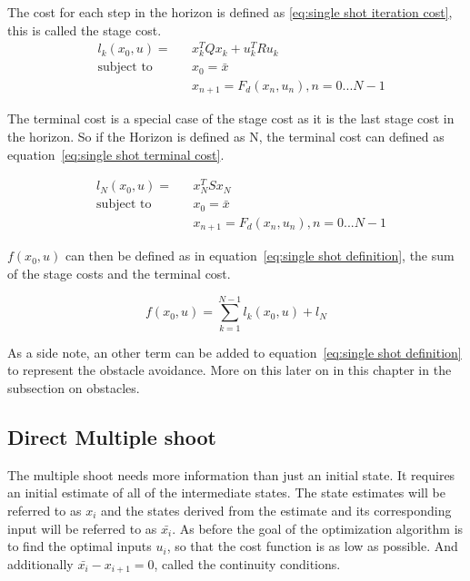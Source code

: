 			The cost for each step in the horizon is defined as \ref{eq:single shot iteration cost}, this is called the stage cost.
			\begin{equation}
				\begin{aligned}
				& l_k(x_0,u) = &&  x_k^T Q x_k  +  u_k^T R u_k \\
				& \text{subject to}			&& x_0 = \bar{x} \\
				& 							&&  x_{n+1} = F_d(x_n,u_n), n=0...N-1
				\end{aligned}
				\label{eq:single shot iteration cost}
			\end{equation}
			
			The terminal cost is a special case of the stage cost as it is the last stage cost in the horizon. So if the Horizon is defined as N, the terminal cost can defined as equation~\ref{eq:single shot terminal cost}.
			
			\begin{equation}
				\begin{aligned}
					& l_N(x_0,u) = && x_N^TSx_N \\
					& \text{subject to}			&& x_0 = \bar{x} \\
					& 							&&  x_{n+1} = F_d(x_n,u_n), n=0...N-1
				\end{aligned}
				\label{eq:single shot terminal cost}
			\end{equation}
			
			$f(x_0,u)$ can then be defined as in equation~\ref{eq:single shot definition}, the sum of the stage costs and the terminal cost.
			
			\begin{equation}
				f(x_0,u) = \sum_{k=1}^{N-1} l_k(x_0,u) + l_N
				\label{eq:single shot definition}
			\end{equation}
			
			As a side note, an other term can be added to equation~\ref{eq:single shot definition} to represent the obstacle avoidance. More on this later on in this chapter in the subsection on obstacles.
		\subsection{Direct Multiple shoot}
			The multiple shoot needs more information than just an initial state. It requires an initial estimate of all of the intermediate states. The state estimates will be referred to as $x_i$ and the states derived from the estimate and its corresponding input will be referred to as $\bar{x_i}$. As before the goal of the optimization algorithm is to find the optimal inputs $u_i$, so that the cost function is as low as possible. And additionally  $\bar{x_i} - x_{i+1} = 0$, called the continuity conditions.
			
